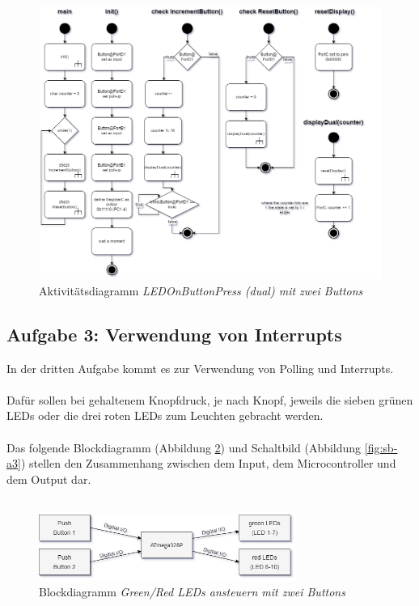 \documentclass{article}
\begin{document}
\begin{figure}[htb]
    \centering
    \includegraphics[width=\textwidth]{images/A2e-AD.png}
    \caption{Aktivitätsdiagramm \textit{LEDOnButtonPress (dual) mit zwei Buttons}}
    \label{fig:ad-a2e}
\end{figure}

\clearpage

\subsection{Aufgabe 3: Verwendung von Interrupts}

In der dritten Aufgabe kommt es zur Verwendung von Polling und Interrupts.
\\
\\ 
Dafür sollen bei gehaltenem Knopfdruck, je nach Knopf, jeweils die sieben grünen LEDs oder die drei roten LEDs zum Leuchten gebracht werden.
\\
\\ Das folgende Blockdiagramm (Abbildung \ref{fig:db-a3}) und Schaltbild (Abbildung \ref{fig:sb-a3}) stellen den Zusammenhang zwischen dem Input, dem Microcontroller und dem Output dar. 
\\ 
\\ 
\begin{figure}[htb]
    \centering
    \includegraphics[width=0.75\textwidth]{images/A3-BD-Interrupts.d.png}
    \caption{Blockdiagramm \textit{Green/Red LEDs ansteuern mit zwei Buttons}}
    \label{fig:db-a3}
\end{figure}
\end{document}
